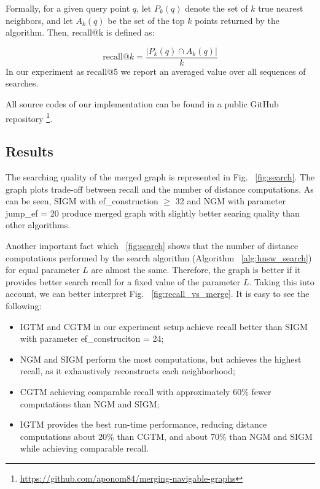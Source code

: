\documentclass{article}
\begin{document}
Formally, for a given query point \(q\), let \(P_k(q)\) denote the set of \(k\) true nearest neighbors, and let \(A_k(q)\) be the set of the top \(k\) points returned by the algorithm. Then, recall@k is defined as:

\[
\text{recall@}k = \frac{|P_k(q) \cap A_k(q)|}{k}
\]
In our experiment as recall@5 we report an averaged value over all sequences of searches.

All source codes of our implementation can be found in a public GitHub repository \footnote{\url{https://github.com/aponom84/merging-navigable-graphs}}.

\subsection{Results}

The searching quality of the merged graph is represented in Fig. ~\ref{fig:search}. The graph plots trade-off between recall and the number of distance computations. As can be seen, \textsc{SIGM} with ef\_construction $\ge$ 32 and \textsc{NGM} with parameter jump\_ef = 20 produce merged graph with slightly better searing quality than other algorithms.

Another important fact which ~\ref{fig:search} shows that the number of distance computations performed by the search algorithm (Algorithm ~\ref{alg:hnsw_search}) for equal parameter $L$ are almost the same.  Therefore, the graph is better if it provides better search recall for a fixed value of the parameter $L$. Taking this into account, we can better interpret Fig. ~\ref{fig:recall_vs_merge}. It is easy to see the following:  

\begin{itemize}
    \item\textsc{IGTM} and \textsc{CGTM} in our experiment setup  achieve recall better than \textsc{SIGM} with parameter ef\_construciton = 24;
    \item \textsc{NGM} and \textsc{SIGM} perform the most computations, but achieves the highest recall, as it exhaustively reconstructs each neighborhood;
    \item \textsc{CGTM} achieving comparable recall with approximately 60\% fewer computations than \textsc{NGM} and \textsc{SIGM};
    \item \textsc{IGTM} provides the best run-time performance, reducing distance computations about 20\% than \textsc{CGTM}, and about 70\% than \textsc{NGM} and \textsc{SIGM} while achieving comparable recall.
\end{itemize}
\end{document}
